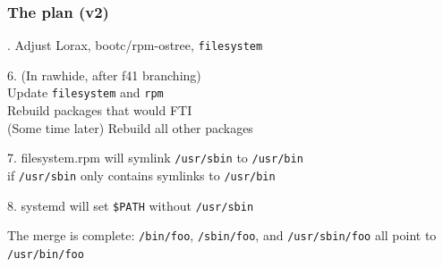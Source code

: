 \documentclass[]{beamer}
\begin{document}
\begin{frame}[fragile]
  \frametitle{The plan (v2)}

  . Adjust Lorax, bootc/rpm-ostree, \texttt{filesystem}
  \\\pause

  6. (In rawhide, after f41 branching)\\
  Update \texttt{filesystem} and \texttt{rpm}\\
  Rebuild packages that would FTI\\
  (Some time later) Rebuild all other packages
  \\\pause

  7. filesystem.rpm will symlink \texttt{/usr/sbin} to \texttt{/usr/bin}\\
  if \texttt{/usr/sbin} only contains symlinks to \texttt{/usr/bin}
  \\\pause

  8. systemd will set \texttt{\$PATH} without \texttt{/usr/sbin}
  \\\pause

  The merge is complete: \texttt{/bin/foo}, \texttt{/sbin/foo}, and
  \texttt{/usr/sbin/foo} all point to \texttt{/usr/bin/foo}
\end{frame}
\end{document}
